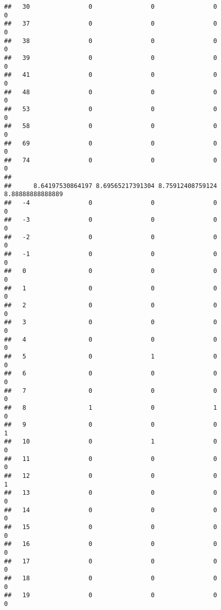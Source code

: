 \documentclass[]{article}
\begin{document}
\begin{verbatim}
##   30                0                0                0                0
##   37                0                0                0                0
##   38                0                0                0                0
##   39                0                0                0                0
##   41                0                0                0                0
##   48                0                0                0                0
##   53                0                0                0                0
##   58                0                0                0                0
##   69                0                0                0                0
##   74                0                0                0                0
##     
##      8.64197530864197 8.69565217391304 8.75912408759124 8.88888888888889
##   -4                0                0                0                0
##   -3                0                0                0                0
##   -2                0                0                0                0
##   -1                0                0                0                0
##   0                 0                0                0                0
##   1                 0                0                0                0
##   2                 0                0                0                0
##   3                 0                0                0                0
##   4                 0                0                0                0
##   5                 0                1                0                0
##   6                 0                0                0                0
##   7                 0                0                0                0
##   8                 1                0                1                0
##   9                 0                0                0                1
##   10                0                1                0                0
##   11                0                0                0                0
##   12                0                0                0                1
##   13                0                0                0                0
##   14                0                0                0                0
##   15                0                0                0                0
##   16                0                0                0                0
##   17                0                0                0                0
##   18                0                0                0                0
##   19                0                0                0                0

\end{verbatim}
\end{document}
